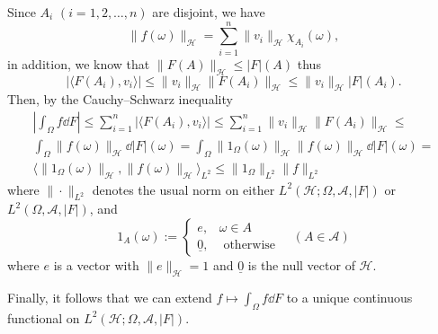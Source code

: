 \documentclass[a4paper, 12pt]{article}
\begin{document}
Since $A_i$ $(i = 1,2, \ldots,n)$ are disjoint, we have
$$\| f(\omega)\|_{\mathcal{H}} = \sum^{n}_{i=1} \| v_i \|_{\mathcal{H}} \chi_{A_i}(\omega),$$
in addition, we know that $\| F(A) \|_{\mathcal{H}} \leqslant |F|(A)$ thus 
$$|\langle F(A_i), v_i\rangle| \leqslant \| v_i \|_{\mathcal{H}} \| F(A_i) \|_{\mathcal{H}} \leqslant \| v_i \|_{\mathcal{H}} |F|(A_i).$$ 
Then, by the Cauchy\---Schwarz inequality
\begin{equation*}
\begin{split}
\left | \int_{\Omega} f \dd{F} \right | \leqslant \sum^{n}_{i=1} |\langle F(A_i), v_i \rangle | \leqslant \sum^{n}_{i=1} \| v_i \|_{\mathcal{H}}  \| F(A_i) \|_{\mathcal{H}} \leqslant \\
\int_{\Omega} \| f(\omega) \|_{\mathcal{H}} \dd{|F|(\omega)} = \int_{\Omega} \| 1_{\Omega}(\omega) \|_{\mathcal{H}} \| f(\omega) \|_{\mathcal{H}} \dd{|F|(\omega)} = \\ \langle \| 1_{\Omega}(\omega) \|_{\mathcal{H}}, \| f(\omega)\|_{\mathcal{H}} \rangle_{L^2} \leqslant \| 1_{\Omega} \|_{L^2} \| f \|_{L^2}
\end{split}
\end{equation*}
where $\| \cdot \|_{L^2}$ denotes the usual norm on either $L^2(\mathcal{H}; \Omega, \mathcal{A}, |F|)$ or $L^2(\Omega, \mathcal{A}, |F|)$, and
$$1_{A}(\omega) := \left\{
    \begin{array}{ll}
      e, & \omega \in A \\
      \underline{0}, &\text{ otherwise}
    \end{array}
\right. \quad (A \in \mathcal{A})$$
where $e$ is a vector with $\| e\|_{\mathcal{H}}=1$ and $\underline{0}$ is the null vector of $\mathcal{H}$.
 
Finally, it follows that we can extend $f \mapsto \int_{\Omega} f \dd{F}$ to a unique continuous functional on $L^2(\mathcal{H};\Omega, \mathcal{A}, |F|)$.
\end{document}
